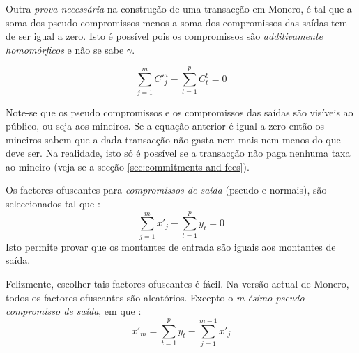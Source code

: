 Outra {\em prova necessária} na construção de uma transacção em Monero, é tal que a soma dos pseudo compromissos menos a soma dos compromissos das saídas tem de ser igual a zero. Isto é possível pois os compromissos são {\em additivamente homomórficos} e não se sabe $\gamma$. 

\[\sum_{j=1}^{m}{C'^a_{j}} - \sum_{t=1}^{p}{C^b_{t}} = 0\]

Note-se que os pseudo compromissos e os compromissos das saídas são visíveis ao público, ou seja aos mineiros. Se a equação anterior é igual a zero então os mineiros sabem que a dada transacção não gasta nem mais nem menos do que deve ser. 
Na realidade, isto só é possível se a transacção não paga nenhuma taxa ao mineiro  (veja-se a secção \ref{sec:commitments-and-fees}).




Os factores ofuscantes para {\em compromissos de saída } (pseudo e normais), são seleccionados tal que :
\[\sum_{j=1}^{m} x'_j  - \sum_{t=1}^{p} y_t = 0\]
Isto permite provar que os montantes de entrada são iguais aos montantes de saída.



Felizmente, escolher tais factores ofuscantes é fácil. Na versão actual de Monero, todos os factores ofuscantes são aleatórios.
Excepto o {\em m-ésimo pseudo compromisso de saída}, em que :
\[x'_m = \sum_{t=1}^{p} y_t - \sum_{j=1}^{m-1} x'_j\]

